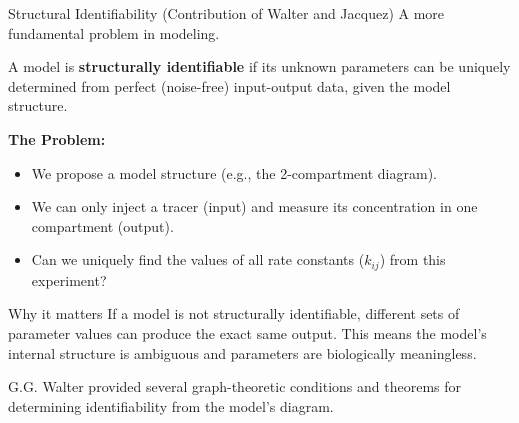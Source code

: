 \documentclass[aspectratio=169]{beamer}\usepackage[]{graphicx}\usepackage[]{xcolor}
\begin{document}
\begin{frame}{Structural Identifiability (Contribution of Walter and Jacquez)}
    A more fundamental problem in modeling.
    \begin{definition}
        A model is \textbf{structurally identifiable} if its unknown parameters can be uniquely determined from perfect (noise-free) input-output data, given the model structure.
    \end{definition}

    \textbf{The Problem:}
    \begin{itemize}
        \item We propose a model structure (e.g., the 2-compartment diagram).
        \item We can only inject a tracer (input) and measure its concentration in one compartment (output).
        \item Can we uniquely find the values of all rate constants ($k_{ij}$) from this experiment?
    \end{itemize}
    \vfill
    \begin{alertblock}{Why it matters}
        If a model is not structurally identifiable, different sets of parameter values can produce the exact same output. This means the model's internal structure is ambiguous and parameters are biologically meaningless.
    \end{alertblock}
    \vfill
    \small{G.G. Walter provided several graph-theoretic conditions and theorems for determining identifiability from the model's diagram.}
\end{frame}
\end{document}
